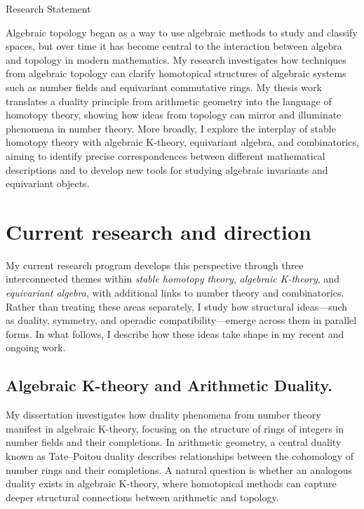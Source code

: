 \documentclass[11pt]{article}
\begin{document}
\begin{center}\LARGE{Research Statement}
\end{center}
\vspace{1em}

Algebraic topology began as a way to use algebraic methods to study and classify spaces, but over time it has become central to the interaction between algebra and topology in modern mathematics.
My research investigates how techniques from algebraic topology can clarify homotopical structures of algebraic systems such as number fields and equivariant commutative rings.
My thesis work translates a duality principle from arithmetic geometry into the language of homotopy theory, showing how ideas from topology can mirror and illuminate phenomena in number theory.
More broadly, I explore the interplay of stable homotopy theory with algebraic K-theory, equivariant algebra, and combinatorics, aiming to identify precise correspondences between different mathematical descriptions and to develop new tools for studying algebraic invariants and equivariant objects.

\section{Current research and direction}

My current research program develops this perspective through three interconnected themes within {\it stable homotopy theory}, {\it algebraic K-theory}, and {\it equivariant algebra}, with additional links to number theory and combinatorics.
Rather than treating these areas separately, I study how structural ideas—such as duality, symmetry, and operadic compatibility—emerge across them in parallel forms.
In what follows, I describe how these ideas take shape in my recent and ongoing work.

\subsection{Algebraic K-theory and Arithmetic Duality.}
My dissertation investigates how duality phenomena from number theory manifest in algebraic K-theory, focusing on the structure of rings of integers in number fields and their completions.
In arithmetic geometry, a central duality known as Tate–Poitou duality describes relationships between the cohomology of number rings and their completions. 
A natural question is whether an analogous duality exists in algebraic K-theory, where homotopical methods can capture deeper structural connections between arithmetic and topology.
\end{document}
